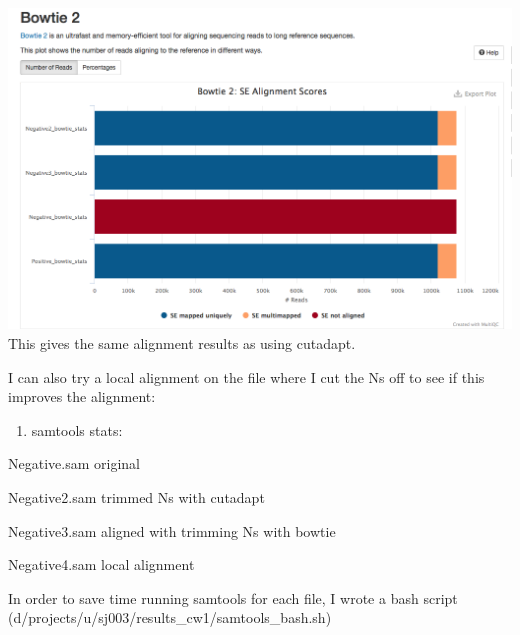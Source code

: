 \documentclass[12pt,]{article}
\newenvironment{Shaded}{\begin{snugshade}}{\end{snugshade}}
\newcommand{\VariableTok}[1]{\textcolor[rgb]{0.00,0.00,0.00}{#1}}
\newcommand{\OperatorTok}[1]{\textcolor[rgb]{0.81,0.36,0.00}{\textbf{#1}}}
\newcommand{\BuiltInTok}[1]{#1}
\newcommand{\NormalTok}[1]{#1}
\providecommand{\tightlist}{%
  \setlength{\itemsep}{0pt}\setlength{\parskip}{0pt}}
\begin{document}
\includegraphics{cw1_q1_multiqc.png}\\
This gives the same alignment results as using cutadapt.

I can also try a local alignment on the file where I cut the Ns off to
see if this improves the alignment:

\begin{Shaded}
\end{Shaded}

\begin{enumerate}
\def\labelenumi{\alph{enumi})}
\setcounter{enumi}{2}
\tightlist
\item
  samtools stats:
\end{enumerate}

Negative.sam original

Negative2.sam trimmed Ns with cutadapt

Negative3.sam aligned with trimming Ns with bowtie

Negative4.sam local alignment

In order to save time running samtools for each file, I wrote a bash
script (d/projects/u/sj003/results\_cw1/samtools\_bash.sh)
\end{document}
